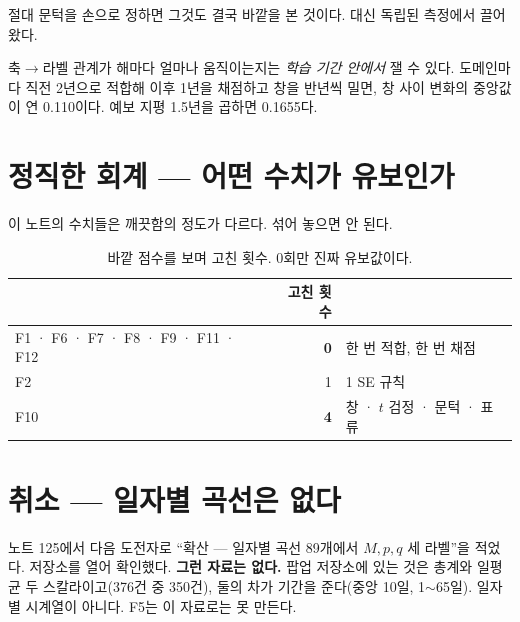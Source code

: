 \documentclass[10pt]{article}
\begin{document}
절대 문턱을 손으로 정하면 그것도 결국 바깥을 본 것이다. 대신 독립된
측정에서 끌어왔다.

축$\to$라벨 관계가 해마다 얼마나 움직이는지는 \emph{학습 기간 안에서} 잴 수
있다. 도메인마다 직전 2년으로 적합해 이후 1년을 채점하고 창을 반년씩 밀면,
창 사이 변화의 중앙값이 연 0.110이다. 예보 지평 1.5년을 곱하면 0.1655다.


\section{정직한 회계 --- 어떤 수치가 유보인가}

이 노트의 수치들은 깨끗함의 정도가 다르다. 섞어 놓으면 안 된다.

\begin{table}[t]
\centering\tsize
\caption{바깥 점수를 보며 고친 횟수. 0회만 진짜 유보값이다.}
\begin{tabular}{lrl}
\toprule
& 고친 횟수 & \\
\midrule
F1 · F6 · F7 · F8 · F9 · F11 · F12 & \textbf{0} & 한 번 적합, 한 번 채점 \\
F2 & 1 & 1 SE 규칙 \\
F10 & \textbf{4} & 창 · $t$ 검정 · 문턱 · 표류 \\
\bottomrule
\end{tabular}
\end{table}


\section{취소 --- 일자별 곡선은 없다}

노트 125에서 다음 도전자로 ``확산 --- 일자별 곡선 89개에서 $M,p,q$ 세
라벨''을 적었다. 저장소를 열어 확인했다. \textbf{그런 자료는 없다.}
팝업 저장소에 있는 것은 총계와 일평균 두 스칼라이고(376건 중 350건),
둘의 차가 기간을 준다(중앙 10일, 1$\sim$65일). 일자별 시계열이 아니다.
F5는 이 자료로는 못 만든다.
\end{document}
